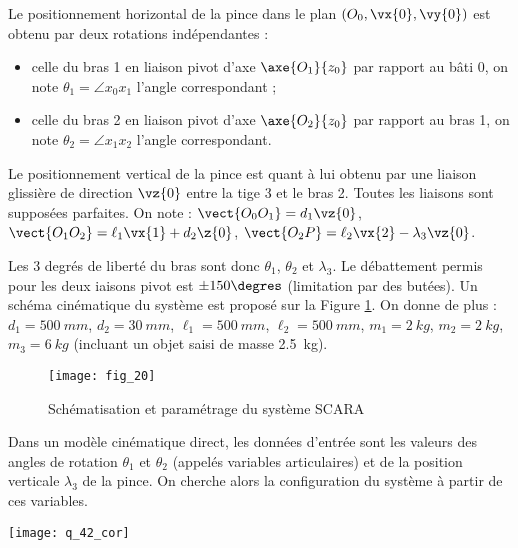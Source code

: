  Le positionnement horizontal de la pince dans le plan $\left(O_0,\vx{0},\vy{0}\right)$ est obtenu par deux rotations indépendantes : 
 \begin{itemize}
 \item celle du bras 1 en liaison pivot d'axe $\axe{O_1}{z_0}$ par rapport au bâti 0, on note $\theta_1 = \angle{x_0}{x_1}$ l'angle correspondant ;
 \item celle du bras 2 en liaison pivot d'axe $\axe{O_2}{z_0}$ par rapport au bras 1, on note $\theta_2 = \angle{x_1}{x_2}$ l'angle correspondant.
 \end{itemize}
 
Le positionnement vertical de la pince est quant à lui obtenu par une liaison glissière de direction
 $\vz{0}$ entre la tige 3 et le bras 2. 
Toutes les liaisons sont supposées parfaites.
On note : $\vect{O_0O_1} = d_1 \vz{0}$, 
$\vect{O_1O_2} = \ell_1 \vx{1}+d_2 \z{0}$, 
$\vect{O_2 P} =\ell_2\vx{2} - \lambda_3 \vz{0}$.

Les 3 degrés de liberté du bras sont donc $\theta_1$, $\theta_2$ et $\lambda_3$. Le débattement permis pour les deux iaisons pivot est $\pm 150\degres$ (limitation par des butées). 
Un schéma cinématique du système est proposé sur la Figure \ref{xens_2027_fig20}.
 On donne de plus :
 $d_1 =\SI{500}{mm}$, $d_2 =\SI{30}{mm}$, $\ell_1=\SI{500}{mm}$, $\ell_2 =\SI{500}{mm}$, 
$m_1 =\SI{2}{kg}$, $m_2=\SI{2}{kg}$, $m_3 =\SI{6}{kg}$ (incluant un objet saisi de masse \SI{2,5}{kg}).

\begin{figure}[!h]
\centering
\texttt{[image: fig\_20]}
\caption{Schématisation et paramétrage du système SCARA \label{xens_2027_fig20}}
\end{figure}




 Dans un modèle cinématique direct, les données d'entrée sont les valeurs des angles de rotation
$\theta_1$ et $\theta_2$ (appelés variables articulaires) et de la position verticale $\lambda_3$ de la pince. On cherche alors la configuration du système à partir de ces variables. 
\fi

  \ifprof
 \begin{corrige}
 \begin{center}
\texttt{[image: q\_42\_cor]}
\end{center}
 \end{corrige}
 \else
 \fi
 
